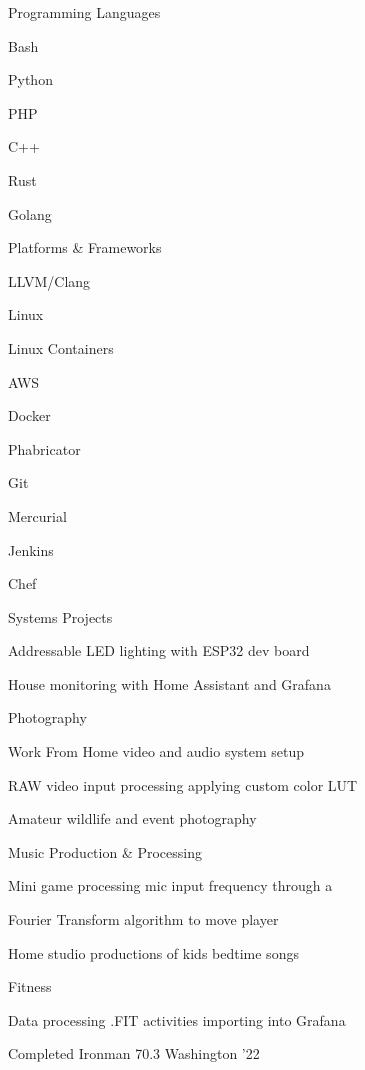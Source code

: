 \begin{cventries}
    \cvskill
    {Programming Languages}
    {
		\begin{cvitems}
			\item Bash
			\item Python
			\item PHP
			\item C++
			\item Rust
			\item Golang
		\end{cvitems}
	}
\end{cventries}
\begin{cventries}
    \cvskill
    {Platforms \& Frameworks}
    {
		\begin{cvitems}
			\item LLVM/Clang
			\item Linux
			\item Linux Containers
			\item AWS
			\item Docker
			\item Phabricator
			\item Git
			\item Mercurial
			\item Jenkins
			\item Chef
		\end{cvitems}
	}
\end{cventries}
\begin{cventries}
	\cvskill
	{Systems Projects}
	{
		\begin{cvitems}
			\item Addressable LED lighting with ESP32 dev board
			\item House monitoring with Home Assistant and Grafana
		\end{cvitems}
	}
	\cvskill
	{Photography}
	{
		\begin{cvitems}
			\item Work From Home video and audio system setup
			\item RAW video input processing applying custom color LUT
			\item Amateur wildlife and event photography
		\end{cvitems}
	}
	\cvskill
	{Music Production \& Processing}
	{
		\begin{cvitems}
			\item Mini game processing mic input frequency through a
			\item Fourier Transform algorithm to move player
			\item Home studio productions of kids bedtime songs
		\end{cvitems}
	}
	\cvskill
	{Fitness}
	{
		\begin{cvitems}
			\item Data processing .FIT activities importing into Grafana 
			\item Completed Ironman 70.3 Washington '22
		\end{cvitems}
	}
\end{cventries}
